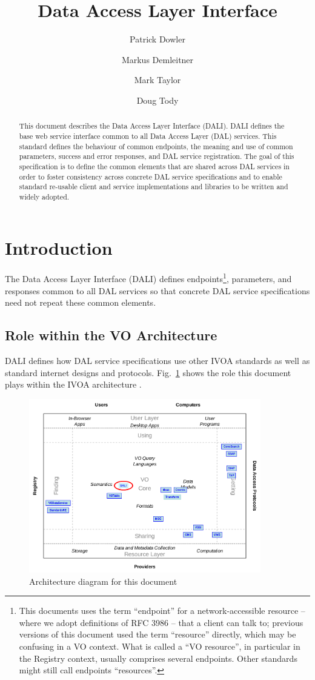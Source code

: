 \documentclass[11pt,letter]{ivoa}
\title{Data Access Layer Interface}
\author{Patrick Dowler}
\author{Markus Demleitner}
\author{Mark Taylor}
\author{Doug Tody}
\begin{document}
\begin{abstract}
This document describes the Data Access Layer Interface (DALI). DALI defines
the base web service interface common to all Data Access Layer (DAL) services.
This standard defines the behaviour of common endpoints, the meaning and use of
common parameters, success and error responses, and DAL service registration.
The goal of this specification is to define the common elements that are shared
across DAL services in order to foster consistency across concrete DAL service
specifications and to enable standard re-usable client and service
implementations and libraries to be written and widely adopted.
\end{abstract}

\section{Introduction}
The Data Access Layer Interface (DALI) defines endpoints\footnote{This
documents uses the term ``endpoint'' for a network-accessible resource
– where we adopt definitions of RFC 3986 \citep{std:RFC3986} -- that a
client can talk to; previous versions of this document used the term
``resource'' directly, which may be confusing in a VO context.  What is
called a ``VO resource'', in particular in the Registry context, usually
comprises several endpoints.  Other standards might still call endpoints ``resources''.},
parameters, and
responses common to all DAL services so that concrete DAL service specifications
need not repeat these common elements.

\subsection{Role within the VO Architecture}
DALI defines how DAL service specifications use other IVOA standards as well as
standard internet designs and protocols. Fig.~\ref{fig:archdiag} shows the role
this document plays within the IVOA architecture \citep{2021ivoa.spec.1101D}.

\begin{figure}
\centering
\includegraphics[width=0.9\textwidth]{role_diagram.pdf}
\caption{Architecture diagram for this document}
\label{fig:archdiag}
\end{figure}
\end{document}
